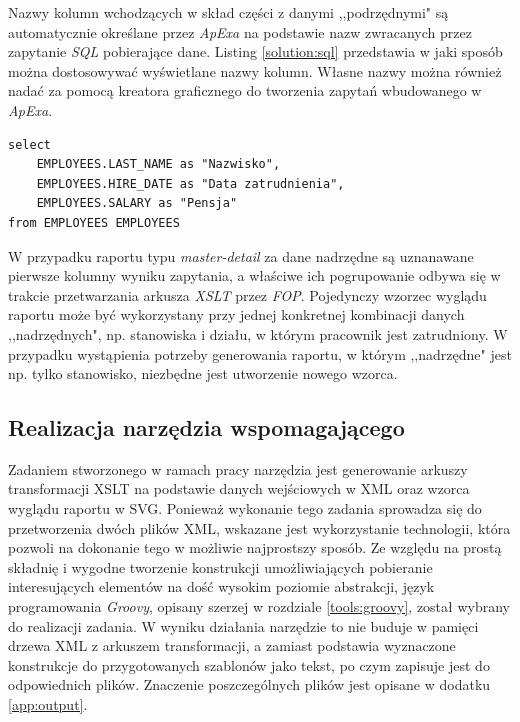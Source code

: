 \documentclass[11pt,a4paper]{article}
\begin{document}
Nazwy kolumn wchodzących w skład części z danymi ,,podrzędnymi" są automatycznie określane przez \emph{ApExa} na podstawie nazw zwracanych przez zapytanie \emph{SQL} pobierające dane. Listing \ref{solution:sql} przedstawia w jaki sposób można dostosowywać wyświetlane nazwy kolumn. Własne nazwy można również nadać za pomocą kreatora graficznego do tworzenia zapytań wbudowanego w \emph{ApExa}. 
 
\lstset{language=SQL}
\begin{lstlisting}[frame=single,caption=Przykładowe zapytanie \emph{SQL},label=solution:sql]
select
    EMPLOYEES.LAST_NAME as "Nazwisko",
    EMPLOYEES.HIRE_DATE as "Data zatrudnienia",
    EMPLOYEES.SALARY as "Pensja"
from EMPLOYEES EMPLOYEES
\end{lstlisting}

W przypadku raportu typu \emph{master-detail} za dane nadrzędne są uznanawane pierwsze kolumny wyniku zapytania, a właściwe ich pogrupowanie odbywa się w trakcie przetwarzania arkusza \emph{XSLT} przez \emph{FOP}. Pojedynczy wzorzec wyglądu raportu może być wykorzystany przy jednej konkretnej kombinacji danych ,,nadrzędnych", np. stanowiska i działu, w którym pracownik jest zatrudniony. W przypadku wystąpienia potrzeby generowania raportu, w którym ,,nadrzędne" jest np. tylko stanowisko, niezbędne jest utworzenie nowego wzorca.


\subsection{Realizacja narzędzia wspomagającego} \label{solution:tool}
Zadaniem stworzonego w ramach pracy narzędzia jest generowanie arkuszy transformacji XSLT na podstawie danych wejściowych w XML oraz wzorca wyglądu raportu w SVG. Ponieważ wykonanie tego zadania sprowadza się do przetworzenia dwóch plików XML, wskazane jest wykorzystanie technologii, która pozwoli na dokonanie tego w możliwie najprostszy sposób. Ze względu na prostą składnię i wygodne tworzenie konstrukcji umożliwiających pobieranie interesujących elementów na dość wysokim poziomie abstrakcji, język programowania \emph{Groovy}, opisany szerzej w rozdziale \ref{tools:groovy}, został wybrany do realizacji zadania.  W wyniku działania narzędzie to nie buduje w pamięci drzewa XML z arkuszem transformacji, a zamiast podstawia wyznaczone konstrukcje do przygotowanych szablonów jako tekst, po czym zapisuje jest do odpowiednich plików. Znaczenie poszczególnych plików jest opisane w dodatku \ref{app:output}.
\end{document}
